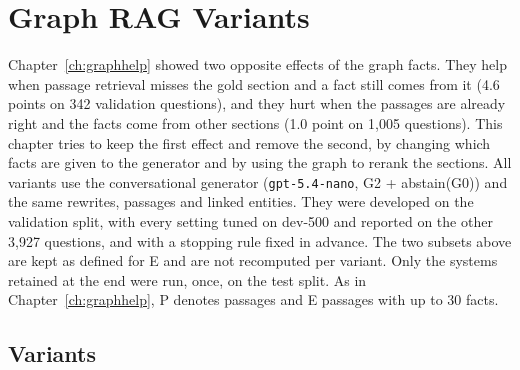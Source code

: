 
\chapter{Graph RAG Variants}\label{ch:graphrag}

Chapter~\ref{ch:graphhelp} showed two opposite effects of the graph facts. They help when
passage retrieval misses the gold section and a fact still comes from it (4.6 points on
342 validation questions), and they hurt when the passages are already right and the
facts come from other sections (1.0 point on 1{,}005 questions). This chapter tries to
keep the first effect and remove the second, by changing which facts are given to the
generator and by using the graph to rerank the sections. All variants use the
conversational generator (\texttt{gpt-5.4-nano}, G2 + abstain(G0)) and the same rewrites,
passages and linked entities. They were developed on the validation split, with every
setting tuned on dev-500 and reported on the other 3{,}927 questions, and with a stopping
rule fixed in advance. The two subsets above are kept as defined for E and are not
recomputed per variant. Only the systems retained at the end were run, once, on the test
split. As in Chapter~\ref{ch:graphhelp}, P denotes passages and E passages with up to 30
facts.


\section{Variants}\label{sec:graphrag:variants}

